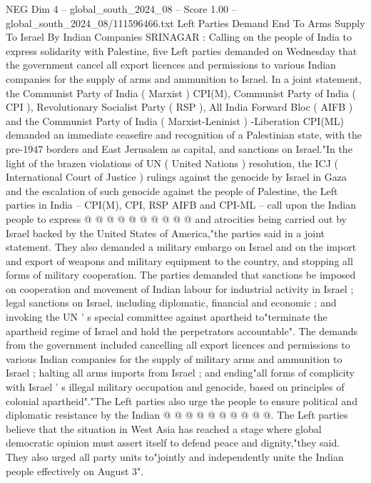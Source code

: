 \begin{textsample}{NEG Dim 4 – global\_south\_2024\_08 – Score 1.00 – global\_south\_2024\_08/111596466.txt}  \label{ex:f4_neg_336}
Left Parties Demand End To Arms Supply To Israel By Indian Companies SRINAGAR : Calling on the people of India to express solidarity with Palestine, five Left parties demanded on Wednesday that the government cancel all export licences and permissions to various Indian companies for the supply of arms and ammunition to Israel.
In a joint statement, the Communist Party of India ( Marxist ) CPI(M), Communist Party of India ( CPI ), Revolutionary Socialist Party ( RSP ), All India Forward Bloc ( AIFB ) and the Communist Party of India ( Marxist-Leninist ) -Liberation CPI(ML) demanded an immediate ceasefire and recognition of a Palestinian state, with the pre-1947 borders and East Jerusalem as capital, and sanctions on Israel."In the light of the brazen violations of UN ( United Nations ) resolution, the ICJ ( International Court of Justice ) rulings against the genocide by Israel in Gaza and the escalation of such genocide against the people of Palestine, the Left parties in India -- CPI(M), CPI, RSP AIFB and CPI-ML -- call upon the Indian people to express @ @ @ @ @ @ @ @ @ @ and atrocities being carried out by Israel backed by the United States of America,"the parties said in a joint statement.
They also demanded a military embargo on Israel and on the import and export of weapons and military equipment to the country, and stopping all forms of military cooperation.
The parties demanded that sanctions be imposed on cooperation and movement of Indian labour for industrial activity in Israel ; legal sanctions on Israel, including diplomatic, financial and economic ; and invoking the UN ' s special committee against apartheid to"terminate the apartheid regime of Israel and hold the perpetrators accountable".
The demands from the government included cancelling all export licences and permissions to various Indian companies for the supply of military arms and ammunition to Israel ; halting all arms imports from Israel ; and ending"all forms of complicity with Israel ' s illegal military occupation and genocide, based on principles of colonial apartheid"."The Left parties also urge the people to ensure political and diplomatic resistance by the Indian @ @ @ @ @ @ @ @ @ @.
The Left parties believe that the situation in West Asia has reached a stage where global democratic opinion must assert itself to defend peace and dignity,"they said.
They also urged all party units to"jointly and independently unite the Indian people effectively on August 3".

\end{textsample}
